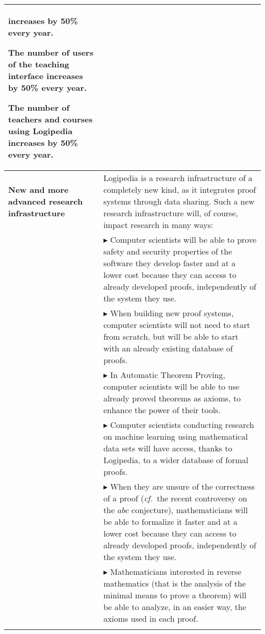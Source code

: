 \begin{longtable}{|p{}|p{}|}
\begin{compactitem}
  increases by 50\% every year.
\item The number of users of the teaching interface 
  increases by 50\% every year.
\item The number of teachers and courses using Logipedia
  increases by 50\% every year.
\end{compactitem}
\\
\hline
{\bf New and more advanced research infrastructure}
&
Logipedia is a research
infrastructure of a completely new kind, as it integrates proof systems
through data sharing. Such a new research infrastructure will, of
course, impact research in many ways:
\\
&
$\blacktriangleright$ Computer scientists
will be able to prove safety and security
  properties of the software they develop faster and at a lower cost
  because they can access to already developed proofs, independently
  of the system they use.
\\
&
$\blacktriangleright$ When building new proof systems, computer scientists will not
  need to start from scratch, but will be able to start with an already
  existing database of proofs.
\\
&
$\blacktriangleright$ In Automatic Theorem Proving, computer scientists will be able
  to use already proved theorems as axioms, to enhance the power of
  their tools.
\\
&
$\blacktriangleright$ Computer scientists conducting research on machine learning
using mathematical data sets will have access, thanks to Logipedia,
to a wider database of formal proofs.
\\
&
$\blacktriangleright$ When they are unsure of the correctness of a proof
({\em cf.}~the
recent controversy on the $abc$ conjecture),
  mathematicians will be able to formalize it faster and at a lower
  cost because they can access to already developed proofs,
  independently of the system they use.
\\
&
$\blacktriangleright$
Mathematicians interested in reverse mathematics (that is the analysis
of the minimal means to prove a theorem) will be able to analyze, in
an easier way, the axioms used in each proof.
\\
&


\end{longtable}
